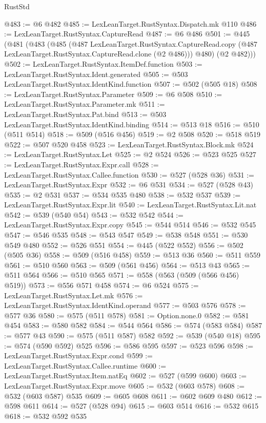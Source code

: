 \begin{lexlean}{RustStd}
\begin{coremodule}
@483 := @6 @482
@485 := LexLeanTarget.RustSyntax.Dispatch.mk @110
@486 := LexLeanTarget.RustSyntax.CaptureRead
@487 := @6 @486
@501 := @445
    (@481
      (@483
        (@485
          (@487
            LexLeanTarget.RustSyntax.CaptureRead.copy
            (@487 LexLeanTarget.RustSyntax.CaptureRead.clone (@2 @486)))
          @480)
        (@2 @482)))
@502 := LexLeanTarget.RustSyntax.ItemDef.function
@503 := LexLeanTarget.RustSyntax.Ident.generated
@505 := @503 LexLeanTarget.RustSyntax.IdentKind.function
@507 := @502 (@505 @18)
@508 := LexLeanTarget.RustSyntax.Parameter
@509 := @6 @508
@510 := LexLeanTarget.RustSyntax.Parameter.mk
@511 := LexLeanTarget.RustSyntax.Pat.bind
@513 := @503 LexLeanTarget.RustSyntax.IdentKind.binding
@514 := @513 @18
@516 := @510 (@511 @514)
@518 := @509 (@516 @456)
@519 := @2 @508
@520 := @518 @519
@522 := @507 @520 @458
@523 := LexLeanTarget.RustSyntax.Block.mk
@524 := LexLeanTarget.RustSyntax.Let
@525 := @2 @524
@526 := @523 @525
@527 := LexLeanTarget.RustSyntax.Expr.call
@528 := LexLeanTarget.RustSyntax.Callee.function
@530 := @527 (@528 @36)
@531 := LexLeanTarget.RustSyntax.Expr
@532 := @6 @531
@534 := @527 (@528 @43)
@535 := @2 @531
@537 := @534 @535 @480
@538 := @532 @537
@539 := LexLeanTarget.RustSyntax.Expr.lit
@540 := LexLeanTarget.RustSyntax.Lit.nat
@542 := @539 (@540 @54)
@543 := @532 @542
@544 := LexLeanTarget.RustSyntax.Expr.copy
@545 := @544 @514
@546 := @532 @545
@547 := @546 @535
@548 := @543 @547
@549 := @538 @548
@551 := @530 @549 @480
@552 := @526 @551
@554 := @445 (@522 @552)
@556 := @502 (@505 @36)
@558 := @509 (@516 @458)
@559 := @513 @36
@560 := @511 @559
@561 := @510 @560
@563 := @509 (@561 @456)
@564 := @513 @43
@565 := @511 @564
@566 := @510 @565
@571 := @558 (@563 (@509 (@566 @456) @519))
@573 := @556 @571 @458
@574 := @6 @524
@575 := LexLeanTarget.RustSyntax.Let.mk
@576 := LexLeanTarget.RustSyntax.IdentKind.operand
@577 := @503 @576
@578 := @577 @36
@580 := @575 (@511 @578)
@581 := Option.none.{0}
@582 := @581 @454
@583 := @580 @582
@584 := @544 @564
@586 := @574 (@583 @584)
@587 := @577 @43
@590 := @575 (@511 @587) @582
@592 := @539 (@540 @18)
@595 := @574 (@590 @592) @525
@596 := @586 @595
@597 := @523 @596
@598 := LexLeanTarget.RustSyntax.Expr.cond
@599 := LexLeanTarget.RustSyntax.Callee.runtime
@600 := LexLeanTarget.RustSyntax.Item.natEq
@602 := @527 (@599 @600)
@603 := LexLeanTarget.RustSyntax.Expr.move
@605 := @532 (@603 @578)
@608 := @532 (@603 @587) @535
@609 := @605 @608
@611 := @602 @609 @480
@612 := @598 @611
@614 := @527 (@528 @94)
@615 := @603 @514
@616 := @532 @615
@618 := @532 @592 @535

\end{coremodule}
\end{lexlean}
